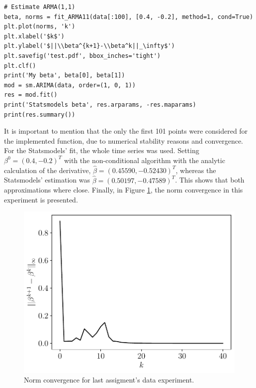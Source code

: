 \documentclass[fleqn]{article}
\begin{document}
\begin{enumerate}
\begin{verbatim}
# Estimate ARMA(1,1)
beta, norms = fit_ARMA11(data[:100], [0.4, -0.2], method=1, cond=True)
plt.plot(norms, 'k')
plt.xlabel('$k$')
plt.ylabel('$||\\beta^{k+1}-\\beta^k||_\infty$')
plt.savefig('test.pdf', bbox_inches='tight')
plt.clf()
print('My beta', beta[0], beta[1])
mod = sm.ARIMA(data, order=(1, 0, 1))
res = mod.fit()
print('Statsmodels beta', res.arparams, -res.maparams)
print(res.summary())
\end{verbatim}
\newpage
It is important to mention that the only the first 101 points were considered for the implemented function, due to numerical stability reasons and convergence. For the Statsmodels' fit, the whole time series was used. Setting $\beta^0=(0.4, -0.2)^T$ with the non-conditional algorithm with the analytic calculation of the derivative, $\hat{\beta}=(0.45590,-0.52430)^T$, whereas the Statsmodels' estimation was $\hat{\beta}=(0.50197, -0.47589)^T$. This shows that both approximations where close. Finally, in Figure \ref{fig:data}, the norm convergence in this experiment is presented.
\begin{figure}[H]
    \centering
    \includegraphics[scale=0.5]{figs/data.pdf}
    \caption{Norm convergence for last assigment's data experiment.}
    \label{fig:data}
\end{figure}

\end{enumerate}
\end{document}
